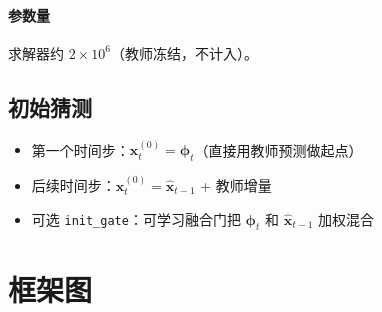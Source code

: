 \documentclass[11pt,a4paper]{ctexart}
\begin{document}
\paragraph{参数量} 求解器约 $2 \times 10^6$（教师冻结，不计入）。

\subsection{初始猜测}

\begin{itemize}
  \item 第一个时间步：$\mathbf{x}^{(0)}_t = \boldsymbol{\phi}_t$（直接用教师预测做起点）
  \item 后续时间步：$\mathbf{x}^{(0)}_t = \hat{\mathbf{x}}_{t-1}$ + 教师增量
  \item 可选 \texttt{init\_gate}：可学习融合门把 $\boldsymbol{\phi}_t$ 和 $\hat{\mathbf{x}}_{t-1}$ 加权混合
\end{itemize}

\section{框架图}
\end{document}
